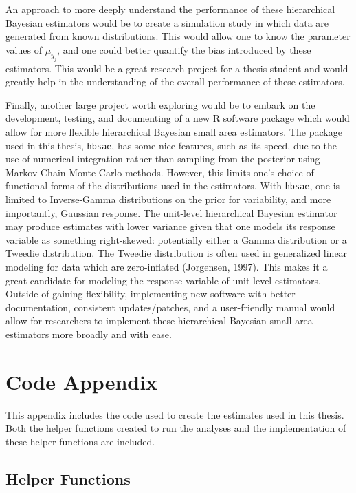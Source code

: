 \documentclass[12pt,twoside]{reedthesis}
\begin{document}
An approach to more deeply understand the performance of these hierarchical Bayesian estimators would be to create a simulation study in which data are generated from known distributions. This would allow one to know the parameter values of \(\mu_{y_j}\), and one could better quantify the bias introduced by these estimators. This would be a great research project for a thesis student and would greatly help in the understanding of the overall performance of these estimators.

Finally, another large project worth exploring would be to embark on the development, testing, and documenting of a new R software package which would allow for more flexible hierarchical Bayesian small area estimators. The package used in this thesis, \texttt{hbsae}, has some nice features, such as its speed, due to the use of numerical integration rather than sampling from the posterior using Markov Chain Monte Carlo methods. However, this limits one's choice of functional forms of the distributions used in the estimators. With \texttt{hbsae}, one is limited to Inverse-Gamma distributions on the prior for variability, and more importantly, Gaussian response. The unit-level hierarchical Bayesian estimator may produce estimates with lower variance given that one models its response variable as something right-skewed: potentially either a Gamma distribution or a Tweedie distribution. The Tweedie distribution is often used in generalized linear modeling for data which are zero-inflated (Jorgensen, 1997). This makes it a great candidate for modeling the response variable of unit-level estimators. Outside of gaining flexibility, implementing new software with better documentation, consistent updates/patches, and a user-friendly manual would allow for researchers to implement these hierarchical Bayesian small area estimators more broadly and with ease.

\appendix

\hypertarget{code-appendix}{%
\chapter{Code Appendix}\label{code-appendix}}

This appendix includes the code used to create the estimates used in this thesis. Both the helper functions created to run the analyses and the implementation of these helper functions are included.

\hypertarget{helper-functions}{%
\section{Helper Functions}\label{helper-functions}}
\end{document}
